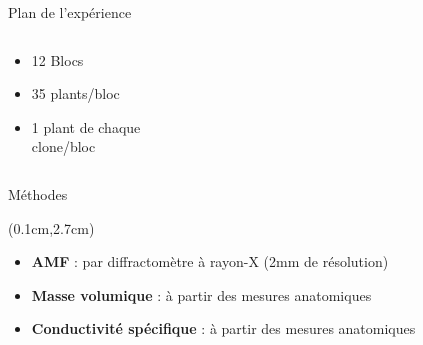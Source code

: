 \documentclass{beamer}
\begin{document}
\begin{frame}{Plan de l'expérience}
\begin{columns}
\begin{column}{0.3\textwidth}
\begin{textblock*}{10cm}
\begin{itemize}
					\vspace{0.2cm}
				    \item 12 Blocs \\
					\vspace{0.2cm} 
					\item 35 plants/bloc \\
					\vspace{0.2cm}
					\item 1 plant de chaque \\
					clone/bloc \\
				\end{itemize}
					\end{textblock*}		
			\end{column}
			
		\end{columns}
	
\end{frame}

\begin{frame}{Méthodes}
	
	\begin{textblock*}{11cm}(0.1cm,2.7cm)
		\begin{itemize} %
			\item \textbf{AMF} : par diffractomètre à rayon-X (2mm de résolution) \\
			\vspace{1cm}
			\item \textbf{Masse volumique} : à partir des mesures anatomiques
			\vspace{1cm}
			\item \textbf{Conductivité spécifique} : à partir des mesures anatomiques
			
			
		\end{itemize}
	\end{textblock*}
	
\end{frame}
\end{document}
